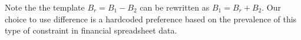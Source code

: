 \documentclass{IEEEtran}
\newcommand{\sergey}[1]{\textcolor{magenta}{{\sc Sergey:} #1}\xspace}
\newcommand{\samuel}[1]{\textcolor{green}{{\sc Samuel:} #1}\xspace}
\newcommand{\tias}[1]{\textcolor{blue}{{\sc Tias:} #1}\xspace}
\newcommand{\constraints}{\ensuremath{\mathcal{T}}\xspace}
\newcommand{\format}[1]{\textit{#1}\xspace}
\newcommand{\extractgroups}{\format{extractGroups}}
\newcommand{\extracttables}{\format{extractTables}}
\newcommand{\learnconstraints}{\format{LearnConstraints}}
\newcommand{\CSignature}{Signature\xspace}
\newcommand{\dependencies}{\ensuremath{\mathcal{D}}\xspace}
\newcommand{\eccalc}[2]{\ensuremath{#1 = #2}}
\newcommand{\ecdiff}[3]{\eccalc{#1}{#2 - #3}}
\theoremstyle{definition}
\begin{document}
Note the the template $\ecdiff{B_r}{B_1}{B_2}$ can be rewritten as $B_1 = B_r + B_2$.
Our choice to use difference is a hardcoded preference based on the prevalence of this type of constraint in financial spreadsheet data.








\end{document}
